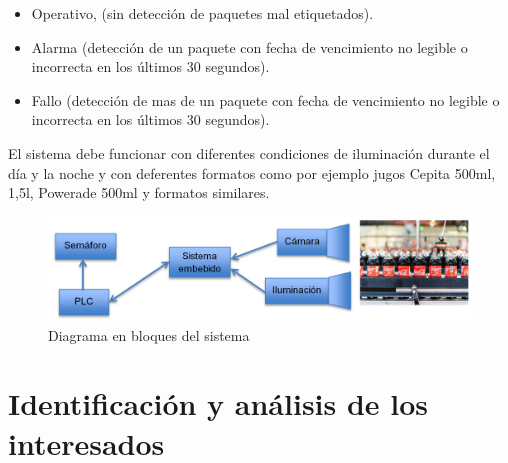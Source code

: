 \documentclass[11pt]{charter}
\begin{document}
\begin{itemize}
\item Operativo, (sin detección de paquetes mal etiquetados).
\item Alarma (detección de un paquete con fecha de vencimiento no legible o incorrecta en los últimos 30 segundos).
\item Fallo (detección de mas de un paquete con fecha de vencimiento no legible o incorrecta en los últimos 30 segundos).
\end{itemize}

El sistema debe funcionar con diferentes condiciones de iluminación durante el día y la noche y con deferentes formatos como por ejemplo jugos Cepita 500ml, 1,5l, Powerade 500ml y formatos similares. 


\vspace{25px}

\begin{figure}[htpb]
\centering 
\includegraphics[width=.7\textwidth]{./Figuras/diagBloques.png}
\caption{Diagrama en bloques del sistema}
\label{fig:diagBloques}
\end{figure}

\vspace{25px}


\newpage
\section{Identificación y análisis de los interesados}
\label{sec:interesados}
\end{document}

